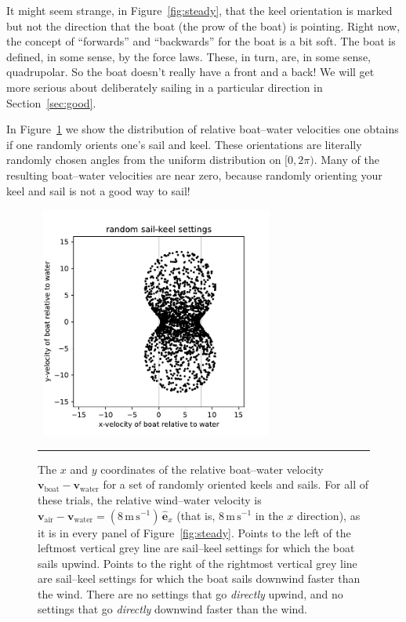 \documentclass[letterpaper]{article}
\renewcommand{\vec}[1]{\boldsymbol{#1}}
\newcommand{\uvec}{\vec{\hat{e}}}
\newcommand{\air}{\text{air}}
\newcommand{\water}{\text{water}}
\newcommand{\boat}{\text{boat}}
\newcommand{\vair}{\vec{v}_\air}
\newcommand{\vwater}{\vec{v}_\water}
\newcommand{\vboat}{\vec{v}_\boat}
\newcommand{\mps}{\mathrm{m\,s^{-1}}}
\newcommand{\secref}[1]{Section~\ref{#1}}
\newcommand{\figref}[1]{Figure~\ref{#1}}
\newcommand{\figurerule}{\rule[1ex]{\textwidth}{0.2pt}}
\begin{document}
It might seem strange, in \figref{fig:steady}, that the keel orientation is marked but not the direction that the boat (the prow of the boat) is pointing.
Right now, the concept of ``forwards'' and ``backwards'' for the boat is a bit soft.
The boat is defined, in some sense, by the force laws.
These, in turn, are, in some sense, quadrupolar.
So the boat doesn't really have a front and a back!
We will get more serious about deliberately sailing in a particular direction in \secref{sec:good}.

In \figref{fig:hourglass} we show the distribution of relative boat--water velocities one obtains if one randomly orients one's sail and keel.
These orientations are literally randomly chosen angles from the uniform distribution on $[0,2\pi)$.
Many of the resulting boat--water velocities are near zero, because randomly orienting your keel and sail is not a good way to sail!
\begin{figure}[t!]
  ~\hfill\includegraphics[width=3in]{hourglass-random.pdf}\hfill~
  \caption{The $x$ and $y$ coordinates of the relative boat--water velocity $\vboat-\vwater$ for a set of randomly oriented keels and sails.
  For all of these trials, the relative wind--water velocity is $\vair-\vwater=(8\,\mps)\,\uvec_x$ (that is, $8\,\mps$ in the $x$ direction), as it is in every panel of \figref{fig:steady}.
  Points to the left of the leftmost vertical grey line are sail--keel settings for which the boat sails upwind. Points to the right of the rightmost vertical grey line are sail--keel settings for which the boat sails downwind faster than the wind.
  There are no settings that go \emph{directly} upwind, and no settings that go \emph{directly} downwind faster than the wind.\label{fig:hourglass}}
  \figurerule
\end{figure}
\end{document}
